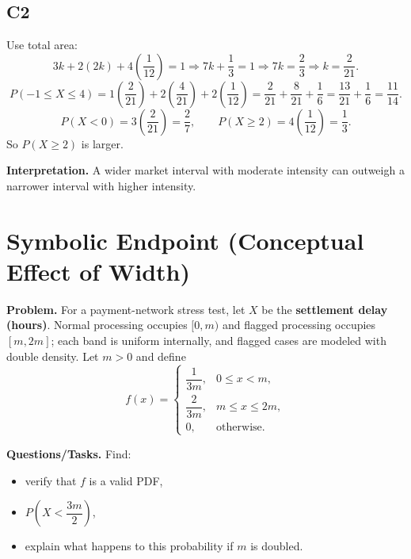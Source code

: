 \subsection*{C2}
Use total area:
\[
3k+2(2k)+4\left(\frac{1}{12}\right)=1
\Rightarrow 7k+\frac{1}{3}=1
\Rightarrow 7k=\frac{2}{3}
\Rightarrow k=\frac{2}{21}.
\]
\[
P(-1\le X\le 4)=1\left(\frac{2}{21}\right)+2\left(\frac{4}{21}\right)+2\left(\frac{1}{12}\right)
=\frac{2}{21}+\frac{8}{21}+\frac{1}{6}
=\frac{13}{21}+\frac{1}{6}
=\frac{11}{14}.
\]
\[
P(X<0)=3\left(\frac{2}{21}\right)=\frac{2}{7},
\qquad
P(X\ge 2)=4\left(\frac{1}{12}\right)=\frac{1}{3}.
\]
So $P(X\ge 2)$ is larger.

\textbf{Interpretation.}
A wider market interval with moderate intensity can outweigh a narrower interval with higher intensity.

\section{Symbolic Endpoint (Conceptual Effect of Width)}

\textbf{Problem.}
For a payment-network stress test, let $X$ be the \textbf{settlement delay (hours)}. Normal processing occupies $[0,m)$ and flagged processing occupies $[m,2m]$; each band is uniform internally, and flagged cases are modeled with double density. Let $m>0$ and define
\[
f(x)=
\begin{cases}
\dfrac{1}{3m}, & 0\le x<m,\\
\dfrac{2}{3m}, & m\le x\le 2m,\\
0, & \text{otherwise.}
\end{cases}
\]

\textbf{Questions/Tasks.}
Find:
\begin{itemize}
    \item[(a)] verify that $f$ is a valid PDF,
    \item[(b)] $P\left(X<\dfrac{3m}{2}\right)$,
    \item[(c)] explain what happens to this probability if $m$ is doubled.
\end{itemize}

